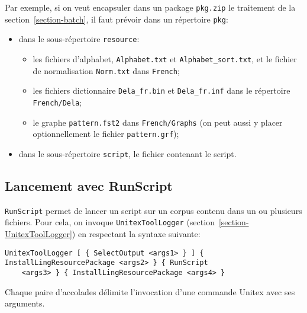\bigskip
\noindent Par exemple, si on veut encapsuler dans un package \verb$pkg.zip$ le traitement de la
section~\ref{section-batch}, il faut prévoir dans un répertoire \verb$pkg$:
\begin{itemize}
\item dans le sous-répertoire \verb$resource$:
\begin{itemize}
\item les fichiers d'alphabet, \verb$Alphabet.txt$ et \verb$Alphabet_sort.txt$, et le fichier de
normalisation \verb$Norm.txt$ dans \verb$French$;
\item les fichiers dictionnaire \verb$Dela_fr.bin$ et \verb$Dela_fr.inf$ dans le répertoire
\verb$French/Dela$;
\item le graphe \verb$pattern.fst2$ dans \verb$French/Graphs$ (on peut aussi y placer optionnellement
le fichier \verb$pattern.grf$);
\end{itemize}
\item dans le sous-répertoire \verb$script$, le fichier contenant le script.
\end{itemize}



\subsection{Lancement avec RunScript}
\label{section-runscript}
\verb$RunScript$ permet de lancer un script sur un corpus contenu dans un ou plusieurs fichiers.
Pour cela, on invoque \verb$UnitexToolLogger$ (section~\ref{section-UnitexToolLogger})
en respectant la syntaxe suivante:

\begin{Verbatim}[fontsize=\small,fontfamily=helvetica]
UnitexToolLogger [ { SelectOutput <args1> } ] { InstallLingResourcePackage <args2> } { RunScript
    <args3> } { InstallLingResourcePackage <args4> }
\end{Verbatim}

\noindent Chaque paire d'accolades délimite l'invocation d'une commande Unitex avec ses arguments.

